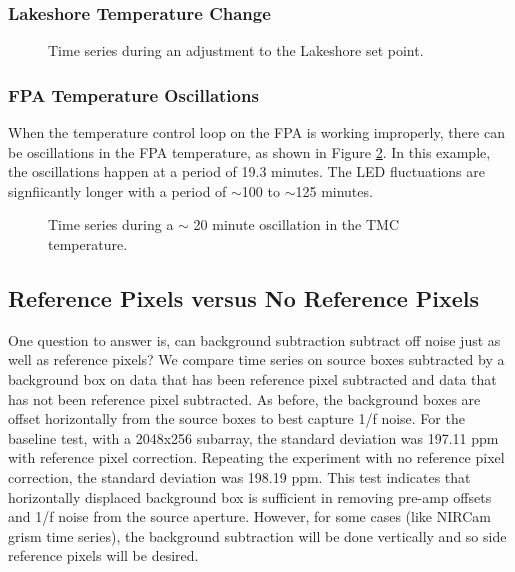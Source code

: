 \documentclass{aastex62}
\begin{document}
\subsubsection{Lakeshore Temperature Change}

\begin{figure}
{}
\caption{Time series during an adjustment to the Lakeshore set point.}\label{fig:indTSeriesLakeshore39p7}
\end{figure}

\subsubsection{FPA Temperature Oscillations}
When the temperature control loop on the FPA is working improperly, there can be oscillations in the FPA temperature, as shown in Figure \ref{fig:indTSeriesTMCoscillations}.
In this example, the oscillations happen at a period of 19.3 minutes.
The LED fluctuations are signfiicantly longer with a period of $\sim$100 to $\sim$125 minutes.

\begin{figure}
{}
\caption{Time series during a $\sim$ 20 minute oscillation in the TMC temperature.}\label{fig:indTSeriesTMCoscillations}
\end{figure}





\clearpage
\subsection{Reference Pixels versus No Reference Pixels}
One question to answer is, can background subtraction subtract off noise just as well as reference pixels?
We compare time series on source boxes subtracted by a background box on data that has been reference pixel subtracted and data that has not been reference pixel subtracted.
As before, the background boxes are offset horizontally from the source boxes to best capture 1/f noise.
For the baseline test, with a 2048x256 subarray, the standard deviation was 197.11 ppm with reference pixel correction.
Repeating the experiment with no reference pixel correction, the standard deviation was 198.19 ppm.
This test indicates that horizontally displaced background box is sufficient in removing pre-amp offsets and 1/f noise from the source aperture.
However, for some cases (like NIRCam grism time series), the background subtraction will be done vertically and so side reference pixels will be desired.
\end{document}
